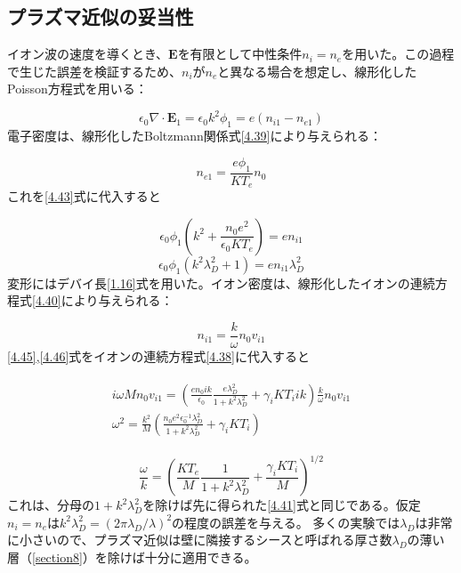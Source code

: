 \documentclass{ltjsarticle}
\numberwithin{equation}{section} %
\begin{document}
\subsection{プラズマ近似の妥当性} \label{section4.7}
イオン波の速度を導くとき、$\bm{E}$を有限として中性条件$n_i=n_e$を用いた。この過程で生じた誤差を検証するため、$n_i$が$n_e$と異なる場合を想定し、線形化したPoisson方程式を用いる：

\begin{equation}
  \epsilon_0 \nabla \cdot \bm{E}_1 = \epsilon_0 k^2\phi_1 = e(n_{i1} - n_{e1}) \label{4.43}
\end{equation}
電子密度は、線形化したBoltzmann関係式\eqref{4.39}により与えられる：

\begin{equation}
  n_{e1} = \frac{e\phi_1}{KT_e}n_0 \label{4.44}
\end{equation}
これを\eqref{4.43}式に代入すると

\begin{equation}
  \epsilon_0 \phi_1\left(k^2 + \frac{n_0e^2}{\epsilon_0 KT_e}\right) = en_{i1} \label{4.45}
\end{equation}
\[
  \epsilon_0 \phi_1(k^2\lambda^2_D + 1) = en_{i1}\lambda^2_D
\]
変形にはデバイ長\eqref{1.16}式を用いた。イオン密度は、線形化したイオンの連続方程式\eqref{4.40}により与えられる：

\begin{equation}
  n_{i1} = \frac{k}{\omega}n_0v_{i1} \label{4.46}
\end{equation}
\eqref{4.45},\eqref{4.46}式をイオンの連続方程式\eqref{4.38}に代入すると

\begin{align}
  \begin{split}
    i\omega Mn_0v_{i1} = \left(\frac{en_0ik}{\epsilon_0}\frac{e\lambda^2_D}{1+k^2\lambda^2_D} + \gamma_iKT_iik\right)\frac{k}{\omega}n_0v_{i1}\\
    \omega^2 = \frac{k^2}{M}\left(\frac{n_0e^2\epsilon^{-1}_0\lambda^2_D}{1+k^2\lambda^2_D} + \gamma_iKT_i\right)
  \end{split} \label{4.47}
\end{align}

\begin{equation}
  \frac{\omega}{k} = \left(\frac{KT_e}{M}\frac{1}{1+k^2\lambda^2_D} + \frac{\gamma_iKT_i}{M}\right)^{1/2} \label{4.48}
\end{equation}
これは、分母の$1+k^2\lambda^2_D$を除けば先に得られた\eqref{4.41}式と同じである。仮定$n_i=n_e$は$k^2\lambda^2_D=(2\pi \lambda_D/\lambda)^2$の程度の誤差を与える。
多くの実験では$\lambda_D$は非常に小さいので、プラズマ近似は壁に隣接するシースと呼ばれる厚さ数$\lambda_D$の薄い層（\ref{section8}）を除けば十分に適用できる。
\end{document}
